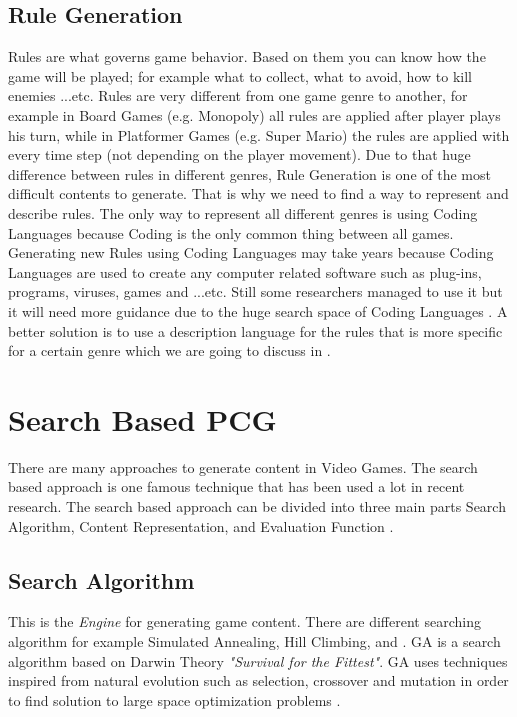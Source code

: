 \subsection{Rule Generation}
Rules are what governs game behavior. Based on them you can know how the game will be played; for example what to collect, what to avoid, how to kill enemies ...etc. Rules are very different from one game genre to another, for example in Board Games (e.g. Monopoly) all rules are applied after player plays his turn, while in Platformer Games (e.g. Super Mario) the rules are applied with every time step (not depending on the player movement). Due to that huge difference between rules in different genres, Rule Generation is one of the most difficult contents to generate. That is why we need to find a way to represent and describe rules. The only way to represent all different genres is using Coding Languages because Coding is the only common thing between all games. Generating new Rules using Coding Languages may take years because Coding Languages are used to create any computer related software such as plug-ins, programs, viruses, games and ...etc. Still some researchers managed to use it but it will need more guidance due to the huge search space of Coding Languages \cite{mechanicMiner}. A better solution is to use a description language for the rules that is more specific for a certain genre which we are going to discuss in  \cite{pcgBookRules}.
 
\section{Search Based PCG}
There are many approaches to generate content in Video Games. The search based approach is one famous technique that has been used a lot in recent research. The search based approach can be divided into three main parts Search Algorithm, Content Representation, and Evaluation Function \cite{pcgBookSearch}.
\subsection{Search Algorithm}
This is the \emph{Engine} for generating game content. There are different searching algorithm for example Simulated Annealing, Hill Climbing, and . GA is a search algorithm based on Darwin Theory \textit{"Survival for the Fittest"}. GA uses techniques inspired from natural evolution such as selection, crossover and mutation in order to find solution to large space optimization problems \cite{geneticAlgorithm}.
